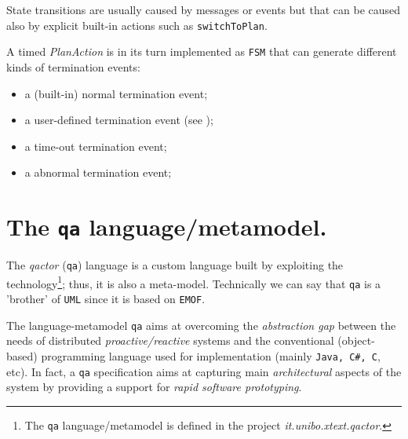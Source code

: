 State transitions are usually caused by messages or events but that can be caused also by explicit built-in actions such as \texttt{switchToPlan}.

A timed \textit{PlanAction} is in its turn implemented as \texttt{FSM} that can generate different kinds of termination events:
\begin{itemize}
\item a (built-in) normal termination event;
\item a user-defined termination event (see );
\item a time-out termination event;
\item a abnormal termination event;
\end{itemize}


\newpage 
\section{The \texttt{qa} language/metamodel.}

The \textit{qactor} (\texttt{qa}) language is a custom language built by exploiting the \xtext{} technology\footnote{The \texttt{qa} language/metamodel is defined in the project \textit{it.unibo.xtext.qactor}.}; thus, it is also a meta-model. Technically we can say that \texttt{qa} is a 'brother' of \texttt{UML} since it is based on \texttt{EMOF}.

The language-metamodel \texttt{qa} aims at overcoming the \textit{abstraction gap} between the needs of distributed \textit{proactive/reactive} systems and the conventional (object-based) programming language used for implementation (mainly \texttt{Java, C\#, C}, etc).
In fact, a \texttt{qa} specification aims at capturing main \textit{architectural} aspects of the system by providing a support for \textit{rapid software prototyping}.




